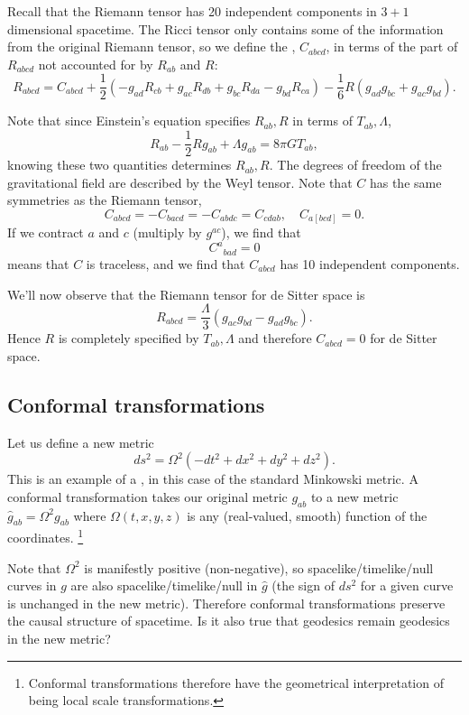 \begin{defn}
Recall that the Riemann tensor has 20 independent components in $3+1$ dimensional spacetime. The Ricci tensor only contains some of the information from the original Riemann tensor, so we define the , $C_{abcd}$, in terms of the part of $R_{abcd}$ not accounted for by $R_{ab}$ and $R$:
$$R_{abcd}=C_{abcd}+\frac{1}{2}(-g_{ad}R_{cb}+g_{ac}R_{db}+g_{bc}R_{da}-g_{bd}R_{ca})-\frac{1}{6}R(g_{ad}g_{bc}+g_{ac}g_{bd}).$$%
\end{defn}
Note that since Einstein's equation specifies $R_{ab},R$ in terms of $T_{ab},\Lambda$,
$$R_{ab}-\frac{1}{2}Rg_{ab}+\Lambda g_{ab}=8\pi G T_{ab},$$
knowing these two quantities determines $R_{ab},R$. The degrees of freedom of the gravitational field are described by the Weyl tensor. Note that $C$ has the same symmetries as the Riemann tensor,
$$C_{abcd}=-C_{bacd}=-C_{abdc}=C_{cdab},\quad C_{a[bcd]}=0.$$
If we contract $a$ and $c$ (multiply by $g^{ac}$), we find that
$${C^a}_{bad}=0$$ means that $C$ is traceless, and we find that $C_{abcd}$ has 10 independent components.

We'll now observe that the Riemann tensor for de Sitter space is
$$R_{abcd}=\frac{\Lambda}{3}(g_{ac}g_{bd}-g_{ad}g_{bc}).$$
Hence $R$ is completely specified by $T_{ab},\Lambda$ and therefore $C_{abcd}=0$ for de Sitter space.

\subsection*{Conformal transformations}
Let us define a new metric
\begin{equation}
    ds^2=\Omega^2(-dt^2+dx^2+dy^2+dz^2).
\end{equation}
This is an example of a , in this case of the standard Minkowski metric. A conformal transformation takes our original metric $g_{ab}$ to a new metric $\hat g_{ab}=\Omega^2 g_{ab}$ where $\Omega(t,x,y,z)$ is any (real-valued, smooth) function of the coordinates.%
    \footnote{Conformal transformations therefore have the geometrical interpretation of being local scale transformations.}

Note that $\Omega^2$ is manifestly positive (non-negative), so spacelike/timelike/null curves in $g$ are also spacelike/timelike/null in $\hat g$ (the sign of $ds^2$ for a given curve is unchanged in the new metric). Therefore conformal transformations preserve the causal structure of spacetime. Is it also true that geodesics remain geodesics in the new metric?

